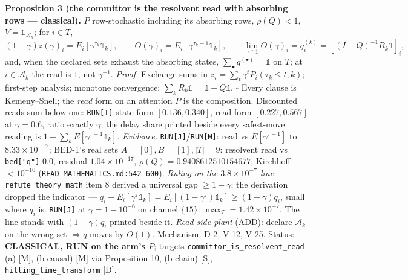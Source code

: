 \documentclass[11pt,a4paper]{article}
\theoremstyle{plain}
\theoremstyle{definition}
\theoremstyle{remark}
\begin{document}
\textbf{Proposition 3 (the committor is the resolvent read with
absorbing rows --- classical).} \(P\) row-stochastic including its
absorbing rows, \(\rho(Q)<1\), \(V=\mathbb 1_{\mathcal A_k}\); for
\(i\in T\),
\[(1-\gamma)z(\gamma)_i=E_i[\gamma^{\tau_k}\mathbb 1_k],\qquad O(\gamma)_i=E_i[\gamma^{\tau_k-1}\mathbb 1_k],\qquad
\lim_{\gamma\uparrow1}O(\gamma)_i=q^{(k)}_i=[(I-Q)^{-1}R_k\mathbb 1]_i,\]
and, when the declared sets exhaust the absorbing states,
\(\sum_\bullet q^{(\bullet)}=\mathbb 1\) on \(T\); at
\(i\in\mathcal A_k\) the read is \(1\), not \(\gamma^{-1}\).
\emph{Proof.} Exchange sums in \(z_i=\sum_t\gamma^tP_i(\tau_k\le t,k)\);
first-step analysis; monotone convergence;
\(\sum_kR_k\mathbb 1=\mathbb 1-Q\mathbb 1\). \(\square\) Every clause is
Kemeny--Snell; the \emph{read} form on an attention \(P\) is the
composition. Discounted reads sum below one: \texttt{RUN{[}I{]}}
state-form \([0.136,0.340]\), read-form \([0.227,0.567]\) at
\(\gamma=0.6\), ratio exactly \(\gamma\); the delay share printed beside
every safest-move reading is \(1-\sum_kE[\gamma^{\tau-1}\mathbb 1_k]\).
\emph{Evidence.} \texttt{RUN{[}J{]}}/\texttt{RUN{[}M{]}}: read vs
\(E[\gamma^{\tau-1}]\) to \(8.33\times10^{-17}\); BED-1's real sets
\(A=[0],B=[1],|T|=9\): resolvent read vs \texttt{bed{[}"q"{]}} \(0.0\),
residual \(1.04\times10^{-17}\), \(\rho(Q)=0.9408612510154677\);
Kirchhoff \(<10^{-10}\) (\texttt{READ\ MATHEMATICS.md:542-600}).
\emph{Ruling on the \(3.8\times10^{-7}\) line.}
\texttt{refute\_theory\_math} item 8 derived a universal gap
\(\ge1-\gamma\); the derivation dropped the indicator ---
\(q_i-E_i[\gamma^{\tau}\mathbb 1_k]=E_i[(1-\gamma^\tau)\mathbb 1_k]\ge(1-\gamma)q_i\),
small where \(q_i\) is. \texttt{RUN{[}J{]}} at \(\gamma=1-10^{-6}\) on
channel \(\{15\}\): \(\max_T=1.42\times10^{-7}\). The line stands with
\((1-\gamma)q_i\) printed beside it. \emph{Read-side plant} (ADD):
declare \(\mathcal A_k\) on the wrong set \(\Rightarrow q\) moves by
\(O(1)\). Mechanism: D-2, V-12, V-25. Status: \textbf{CLASSICAL, RUN on
the arm's \(P\)}; targets \texttt{committor\_is\_resolvent\_read} (a)
{[}M{]}, (b-causal) {[}M{]} via Proposition 10, (b-chain) {[}S{]},
\texttt{hitting\_time\_transform} {[}D{]}.
\end{document}
